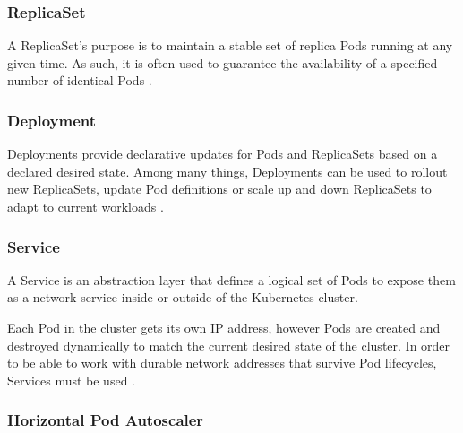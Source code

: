 \subsubsection{ReplicaSet}

A ReplicaSet's purpose is to maintain a stable set of replica Pods running at any given time. As such, it is often used to guarantee the availability of a specified number of identical Pods \cite{KubernetesReplicaSet}.

\subsubsection{Deployment}

Deployments provide declarative updates for Pods and ReplicaSets based on a declared desired state. Among many things, Deployments can be used to rollout new ReplicaSets, update Pod definitions or scale up and down ReplicaSets to adapt to current workloads \cite{KubernetesDeployment}.

\subsubsection{Service} \label{k8s-service}

A Service is an abstraction layer that defines a logical set of Pods to expose them as a network service inside or outside of the Kubernetes cluster.

Each Pod in the cluster gets its own IP address, however Pods are created and destroyed dynamically to match the current desired state of the cluster. In order to be able to work with durable network addresses that survive Pod lifecycles, Services must be used \cite{KubernetesService}.


\subsubsection{Horizontal Pod Autoscaler}

